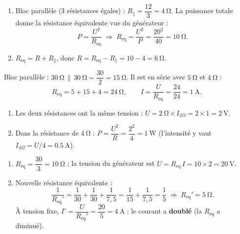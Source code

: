 \documentclass[11pt,a4paper]{article}
\begin{document}
\usetikzlibrary{babel}
\begin{corrige}
\begin{enumerate}[label=\alph*)]
  \item Bloc parallèle (3 résistances égales) : $R_{\parallel}=\dfrac{12}{3}=\qty{4}{\ohm}$.
        La puissance totale donne la résistance équivalente vue du générateur :
        \[ P=\frac{U^{2}}{R_{\text{eq}}}\;\Rightarrow\; R_{\text{eq}}=\frac{U^{2}}{P}=\frac{20^{2}}{40}=\qty{10}{\ohm}. \]
  \item $R_{\text{eq}}=R+R_{\parallel}$, donc $R=R_{\text{eq}}-R_{\parallel}=10-4=\qty{6}{\ohm}$.
\end{enumerate}
\end{corrige}

\begin{corrige}
Bloc parallèle : $\qty{30}{\ohm}\,\|\,\qty{30}{\ohm}=\dfrac{30}{2}=\qty{15}{\ohm}$. Il est en série avec
$\qty{5}{\ohm}$ et $\qty{4}{\ohm}$ :
\[ R_{\text{eq}}=5+15+4=\qty{24}{\ohm},\qquad I=\frac{U}{R_{\text{eq}}}=\frac{24}{24}=\qty{1}{\ampere}. \]
\end{corrige}

\begin{corrige}
\begin{enumerate}[label=\alph*)]
  \item Les deux résistances ont la même tension : $U=\qty{2}{\ohm}\times I_{2\Omega}=2\times1=\qty{2}{\volt}$.
  \item Dans la résistance de $\qty{4}{\ohm}$ : $P=\dfrac{U^{2}}{R}=\dfrac{2^{2}}{4}=\qty{1}{\watt}$
        (l'intensité y vaut $I_{4\Omega}=U/4=\qty{0.5}{\ampere}$).
\end{enumerate}
\end{corrige}

\begin{corrige}
\begin{enumerate}[label=\alph*)]
  \item $R_{\text{eq}}=\dfrac{30}{3}=\qty{10}{\ohm}$ ; la tension du générateur est
        $U=R_{\text{eq}}\,I=10\times2=\qty{20}{\volt}$.
  \item Nouvelle résistance équivalente :
        \[ \frac{1}{R_{\text{eq}}'}=\frac{1}{30}+\frac{1}{30}+\frac{1}{7{,}5}=\frac{1}{15}+\frac{1}{7{,}5}
           =\frac{1}{5}\;\Rightarrow\; R_{\text{eq}}'=\qty{5}{\ohm}. \]
        À tension fixe, $I'=\dfrac{U}{R_{\text{eq}}'}=\dfrac{20}{5}=\qty{4}{\ampere}$ : le courant a
        \textbf{doublé} (la $R_{\text{eq}}$ a diminué).
\end{enumerate}
\end{corrige}
\end{document}
